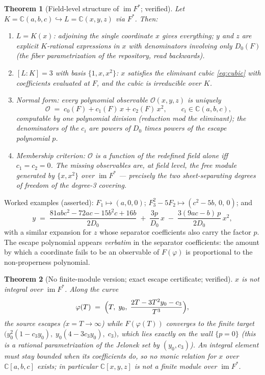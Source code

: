 \documentclass[11pt]{article}
\newtheorem{theorem}{Theorem}[section]
\theoremstyle{definition}
\theoremstyle{remark}
\newcommand{\C}{\mathbb{C}}
\newcommand{\im}{\operatorname{im}}
\begin{document}
\begin{theorem}[Field-level structure of $\im F^*$; verified]
\label{thm:basis}
Let $K = \C(a,b,c) \hookrightarrow L = \C(x,y,z)$ via $F^*$. Then:
\begin{enumerate}
\item $L = K(x)$: adjoining the single coordinate $x$ gives everything;
 $y$ and $z$ are explicit $K$-rational expressions in $x$ with
 denominators involving only $D_0(F)$ (the fiber parametrization of the
 repository, read backwards).
\item $[L:K]=3$ with basis $\{1,x,x^2\}$: $x$ satisfies the eliminant
 cubic \eqref{eq:cubic} with coefficients evaluated at $F$, and the
 cubic is irreducible over $K$.
\item \emph{Normal form:} every polynomial observable
 $\mathcal{O}(x,y,z)$ is uniquely
 \[
 \mathcal{O} \;=\; c_0(F) + c_1(F)\,x + c_2(F)\,x^2,
 \qquad c_i \in \C(a,b,c),
 \]
 computable by one polynomial division (reduction mod the eliminant);
 the denominators of the $c_i$ are powers of $D_0$ times powers of the
 escape polynomial $p$.
\item \emph{Membership criterion:} $\mathcal{O}$ is a function of the
 redefined field alone iff $c_1 = c_2 = 0$. The missing observables
 are, at field level, the free module generated by $\{x, x^2\}$ over
 $\im F^*$ --- precisely the two sheet-separating degrees of freedom of
 the degree-3 covering.
\end{enumerate}
\end{theorem}

Worked examples (asserted): $F_1 \mapsto (a,0,0)$;
$F_3^2 - 5F_2 \mapsto (c^2-5b,\,0,\,0)$; and
\[
y \;=\; \frac{81abc^2 - 72ac - 15b^2c + 16b}{2D_0}
 \;+\; \frac{3p}{D_0}\,x
 \;-\; \frac{3(9ac-b)\,p}{2D_0}\,x^2 ,
\]
with a similar expansion for $z$ whose separator coefficients also carry
the factor $p$. The escape polynomial appears \emph{verbatim} in the
separator coefficients: the amount by which a coordinate fails to be an
observable of $F(\varphi)$ is proportional to the non-properness
polynomial.

\begin{theorem}[No finite-module version; exact escape certificate;
verified]\label{thm:nonintegral}
$x$ is not integral over $\im F^*$. Along the curve
\[
\varphi(T) \;=\; \Bigl(T,\; y_0,\; \frac{2T - 3T^2y_0 - c_3}{T^3}\Bigr),
\]
the source escapes ($x = T \to \infty$) while $F(\varphi(T))$ converges
to the finite target
$\bigl(y_0^2(1-c_3y_0),\; y_0(4-3c_3y_0),\; c_3\bigr)$, which lies
exactly on the wall $\{p=0\}$ (this is a rational parametrization of the
Jelonek set by $(y_0,c_3)$). An integral element must stay bounded when
its coefficients do, so no monic relation for $x$ over $\C[a,b,c]$
exists; in particular $\C[x,y,z]$ is not a finite module over
$\im F^*$.
\end{theorem}
\end{document}
